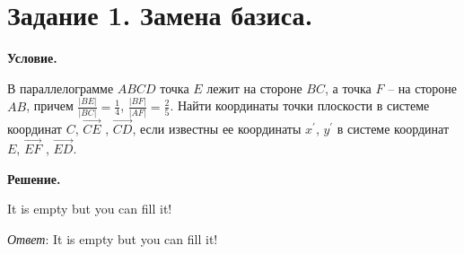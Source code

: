 \section{Задание 1. Замена базиса.}

\textbf{Условие.}

В параллелограмме $ABCD$ точка $E$ лежит на стороне $BC$, а точка $F$ – на стороне $AB$, причем $\displaystyle \frac{|BE|}{|BC|} = \frac{1}{4}$, $\displaystyle \frac{|BF|}{|AF|} = \frac{2}{5}$.
Найти координаты точки плоскости в системе координат $C$, $\overrightarrow{CE}$ , $\overrightarrow{CD}$,
если известны ее координаты $x^\prime$, $y^\prime$ в системе координат $E$, $\overrightarrow{EF}$ , $\overrightarrow{ED}$.
\vspace{10mm}

\textbf{Решение.}

It is empty but you can fill it!

\textit{Ответ}: It is empty but you can fill it!
\clearpage

